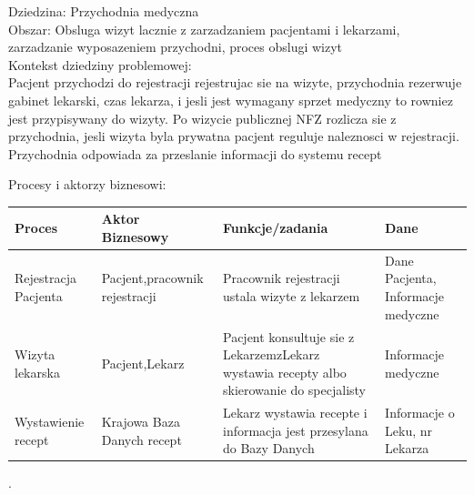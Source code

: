 \documentclass{article}
\author{Dawid S. Jakubczyk}
\begin{document}
Dziedzina: Przychodnia medyczna\\
Obszar: Obsluga wizyt lacznie z zarzadzaniem pacjentami i lekarzami, zarzadzanie wyposazeniem przychodni, proces obslugi wizyt\\

Kontekst dziedziny problemowej:\\
Pacjent przychodzi do rejestracji rejestrujac sie na wizyte, przychodnia rezerwuje gabinet lekarski, czas lekarza, i jesli jest wymagany sprzet medyczny to rowniez jest przypisywany do wizyty. Po wizycie publicznej NFZ rozlicza sie z przychodnia, jesli wizyta byla prywatna pacjent reguluje naleznosci w rejestracji.
Przychodnia odpowiada za przeslanie informacji do systemu recept 


Procesy i aktorzy biznesowi:\\
\begin{tabular}{|m{6em}|m{10em}|m{15em}|m{10em}|}
\hline
\rowcolor{lightgray} Proces & Aktor Biznesowy & Funkcje/zadania & Dane\\
\hline
Rejestracja Pacjenta	& Pacjent,\newline pracownik rejestracji & Pracownik rejestracji ustala wizyte z lekarzem & Dane Pacjenta, Informacje medyczne\\
\hline
Wizyta lekarska & Pacjent,\newline Lekarz	& Pacjent konsultuje sie z Lekarzemz\newline Lekarz wystawia recepty albo skierowanie do specjalisty& Informacje medyczne\\
\hline
Wystawienie recept & Krajowa Baza Danych recept&Lekarz wystawia recepte i informacja jest przesylana do Bazy Danych&Informacje o Leku, nr Lekarza\\
\hline
\end{tabular}




.
\end{document}
